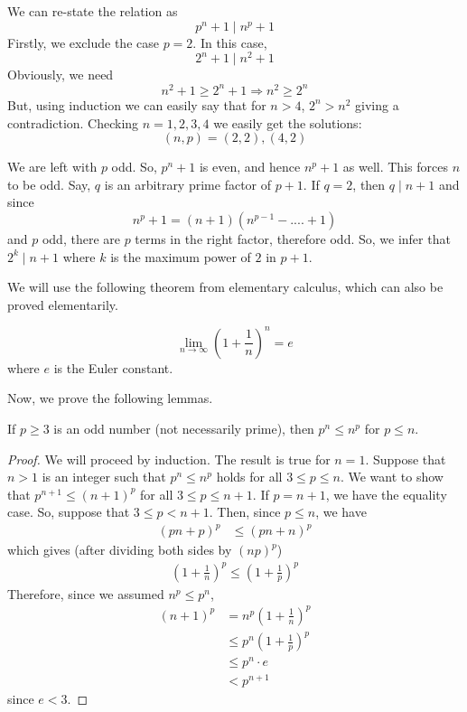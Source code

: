 \documentclass[problems.tex]{subfile}
\begin{document}
	\begin{solution}
		We can re-state the relation as \[p^n+1\mid n^p+1\]
		Firstly, we exclude the case $p=2$. In this case, \[2^n+1\mid n^2+1\]
		Obviously, we need \[n^2+1\ge2^n+1\Rightarrow n^2\ge2^n\]
		But, using induction we can easily say that for $n>4$, $2^n>n^2$ giving a contradiction. Checking $n=1,2,3,4$ we easily get the solutions: \[(n,p)=(2,2), (4,2)\]

		We are left with $p$ odd. So, $p^n+1$ is even, and hence $n^p+1$ as well. This forces $n$ to be odd. Say, $q$ is an arbitrary prime factor of $p+1$. If $q=2$, then $q\mid n+1$ and since \[n^p+1=(n+1)(n^{p-1}-....+1)\]
		and $p$ odd, there are $p$ terms in the right factor, therefore odd. So, we infer that $2^k\mid n+1$ where $k$ is the maximum power of $2$ in $p+1$.

		We will use the following theorem from elementary calculus, which can also be proved elementarily.

		\begin{theorem}
			\[\lim\limits_{n\to\infty}\left(1+\frac{1}{n}\right) ^ {n}=e\]
			where $e$ is the Euler constant.
		\end{theorem}

		Now, we prove the following lemmas.
		\begin{lemma}\label{lem:aditya-generalized}
			If $p \geq 3$ is an odd number (not necessarily prime), then $p^n\le n^p$ for $p\le n$.
		\end{lemma}

		\begin{proof}[Proof]
			We will proceed by induction. The result is true for $n=1$. Suppose that $n>1$ is an integer such that $p^n \leq n^p$ holds for all $3 \leq p \leq n$. We want to show that $p^{n+1} \leq (n+1)^p$ for all $3 \leq p \leq n+1$. If $p=n+1$, we have the equality case. So, suppose that $3 \leq p < n+1$. Then, since $p\le n$, we have
				\begin{align*}
					(pn+p)^p
						& \le (pn+n)^p
				\end{align*}
			which gives (after dividing both sides by $(np)^p$)
				\begin{align*}
					\left(1 + \frac{1}{n}\right)^p \leq  \left(1 + \frac{1}{p}\right)^p
				\end{align*}
			Therefore, since we assumed $n^p \leq p^n$,
				\begin{align*}
					(n+1)^p & = n^p\left(1+\frac{1}{n}\right)^p\\
							&\leq p^n\left(1+\frac{1}{p}\right)^p\\
							& \le p^n\cdot e\\
							& < p^{n+1}
				\end{align*}
		since $e<3$.
	\end{proof}


\end{solution}
\end{document}
